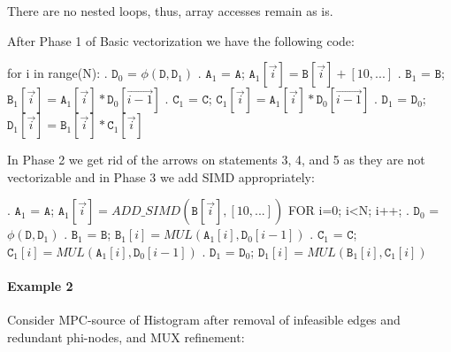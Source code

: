 \documentclass[sigconf, screen, natbib=false, dvipsnames, table]{acmart}
\theoremstyle{definition}
\begin{document}
There are no nested loops, thus, array accesses remain as is.

After Phase 1 of Basic vectorization we have the following code:
\begin{algorithmic}
\STATE for i in range(N):
. $\texttt{D}_0$ = $\phi(\texttt{D},\texttt{D}_1)$
. $\texttt{A}_1$ = $\texttt{A}$; $\texttt{A}_1[\stackrel{\rightarrow}{i}] = \texttt{B}[\stackrel{\rightarrow}i] + [10,...]$
. $\texttt{B}_1$ = $\texttt{B}$; $\texttt{B}_1[\stackrel{\rightarrow}i] = \texttt{A}_1[\stackrel{\rightarrow}i] * \texttt{D}_0[\stackrel{\rightarrow}{i-1}]$
. $\texttt{C}_1$ = $\texttt{C}$; $\texttt{C}_1[\stackrel{\rightarrow}i] = \texttt{A}_1[\stackrel{\rightarrow}i] * \texttt{D}_0[\stackrel{\rightarrow}{i-1}]$
. $\texttt{D}_1$ = $\texttt{D}_0$; $\texttt{D}_1[\stackrel{\rightarrow}i] = \texttt{B}_1[\stackrel{\rightarrow}i] * \texttt{C}_1[\stackrel{\rightarrow}i]$
\end{algorithmic}

In Phase 2 we get rid of the arrows on statements 3, 4, and 5 as they are not vectorizable and in Phase 3 we add SIMD appropriately:

\begin{algorithmic}
. $\texttt{A}_1$ = $\texttt{A}$; $\texttt{A}_1[\stackrel{\rightarrow}{i}] = \mathit{ADD\_SIMD}(\texttt{B}[\stackrel{\rightarrow}i],[10,...])$ 
\STATE FOR i=0; i<N; i++; 
. $\texttt{D}_0$ = $\phi(\texttt{D},\texttt{D}_1)$
. $\texttt{B}_1$ = $\texttt{B}$; $\texttt{B}_1[i] = \mathit{MUL}(\texttt{A}_1[i], \texttt{D}_0[{i-1}])$
. $\texttt{C}_1$ = $\texttt{C}$; $\texttt{C}_1[i] = \mathit{MUL}(\texttt{A}_1[i], \texttt{D}_0[{i-1}])$
. $\texttt{D}_1$ = $\texttt{D}_0$; $\texttt{D}_1[i] = \mathit{MUL}(\texttt{B}_1[i], \texttt{C}_1[i])$
\end{algorithmic}


\paragraph{Example 2}

Consider MPC-source of Histogram after removal of infeasible edges and redundant phi-nodes, and MUX refinement:
\end{document}
